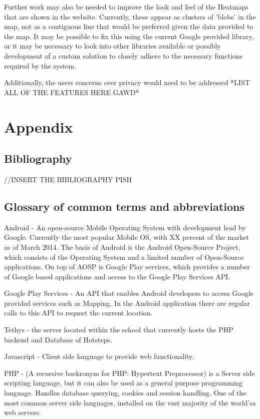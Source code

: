 \documentclass{l4proj}
\begin{document}
Further work may also be needed to improve the look and feel of the Heatmaps that are shown in the website. Currently, these appear as clusters of 'blobs' in the map, not as a contiguous line that would be preferred given the data provided to the map. It may be possible to fix this using the current Google provided library, or it may be necessary to look into other libraries available or possibly development of a custom solution to closely adhere to the necessary functions required by the system.

Additionally, the users concerns over privacy would need to be addressed 
*LIST ALL OF THE FEATURES HERE GAWD*


\chapter{Appendix}

\section{Bibliography}

//INSERT THE BIBLIOGRAPHY PISH

\section{Glossary of common terms and abbreviations}

Android - An open-source Mobile Operating System with development lead by Google. Currently the most popular Mobile OS, with XX percent of the market as of March 2014. The basis of Android is the Android Open-Source Project, which consists of the Operating System and a limited number of Open-Source applications. On top of AOSP is Google Play services, which provides a number of Google based applications and access to the Google Play Services API.

Google Play Services - An API that enables Android developers to access Google provided services such as Mapping. In the Android application there are regular calls to this API to request the current location.

Tethys - the server located within the school that currently hosts the PHP backend and Database of Hotsteps.

Javascript - Client side language to provide web functionality.

PHP - (A recursive backronym for PHP: Hypertext Preprocessor) is a Server side scripting language, but it can also be used as a general purpose programming language. Handles database querying, cookies and session handling. One of the most common server side languages, installed on the vast majority of the world'sa web servers.
\end{document}
